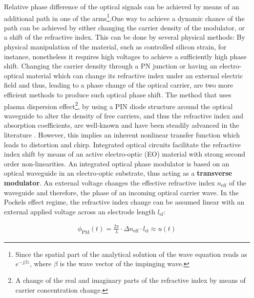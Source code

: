 Relative phase difference of the optical signals can be achieved by means of an additional path in one of the arms\footnote{Since the spatial part of the analytical solution of the wave equation reads as $e^{-j\beta z}$, where $\beta$ is the wave vector of the impinging wave.}.One way to achieve a dynamic chance of the path can be achieved by either changing the carrier density of the modulator, or a shift of the refractive index. This can be done by several physical methods: By physical manipulation of the material, such as controlled silicon strain, for instance, nonetheless it requires high voltages to achieve a sufficiently high phase shift. Changing the carrier density through a PN junction or having an electro-optical material which can change its refractive index under an external electric field and thus, leading to a phase change of the optical carrier, are two more efficient methods to produce such optical phase shift. The method that uses plasma dispersion effect\footnote{A change of the real and imaginary parts of the refractive index by means of carrier concentration change\cite{Reedmod05}.}, by using a PIN diode structure around the optical waveguide to alter the density of free carriers, and thus the refractive index and absorption coefficients, are well-known and have been steadily advanced in the literature \cite{ReedSOI14}. However, this implies an inherent nonlinear transfer function which leads to distortion and chirp\cite{LinMZM14}. Integrated optical circuits facilitate the refractive index shift by means of an active electro-optic (EO) material with strong second order non-linearities. An integrated optical phase modulator is based on an optical waveguide in an electro-optic substrate, thus acting as a \textbf{transverse modulator}. An external voltage changes the effective refractive index $n_\text{eff}$ of the waveguide and therefore, the phase of an incoming optical carrier wave. In the Pockels effect regime, the refractive index change can be assumed linear with an external applied voltage across an electrode length $l_\text{el}$:



\begin{align}
\phi_\text{PM}(t) = \frac{2\pi}{\lambda} \cdot \Delta n_\text{eff} \cdot l_\text{el} \approx u(t)
\end{align}

